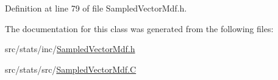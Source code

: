 Definition at line 79 of file Sampled\-Vector\-Mdf.\-h.



The documentation for this class was generated from the following files\-:\begin{DoxyCompactItemize}
\item 
src/stats/inc/\hyperlink{_sampled_vector_mdf_8h}{Sampled\-Vector\-Mdf.\-h}\item 
src/stats/src/\hyperlink{_sampled_vector_mdf_8_c}{Sampled\-Vector\-Mdf.\-C}\end{DoxyCompactItemize}
